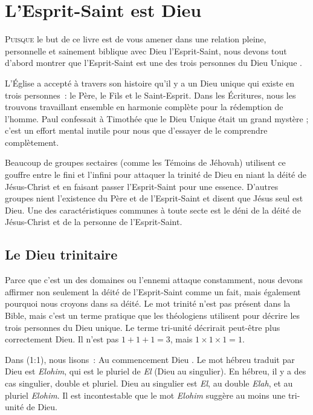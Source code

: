\chapter{L'Esprit-Saint est Dieu}

\lettrine[lines=3]{P}{uisque} le but de ce livre est de vous amener dans une relation pleine, personnelle et sainement biblique avec Dieu l'Esprit-Saint, nous devons tout d'abord montrer que l'Esprit-Saint est une des trois personnes du Dieu Unique .

L'Église a accepté à travers son histoire qu'il y a un Dieu unique qui existe en trois personnes~: le Père, le Fils et le Saint-Esprit. Dans les Écritures, nous les trouvons travaillant ensemble en harmonie complète pour la rédemption de l'homme. Paul confessait à Timothée que le Dieu Unique était un grand mystère ; c'est un effort mental inutile pour nous que d'essayer de le comprendre complètement.

Beaucoup de groupes sectaires (comme les Témoins de Jéhovah) utilisent ce gouffre entre le fini et l'infini pour attaquer la trinité de Dieu en niant la déité de Jésus-Christ et en faisant passer l'Esprit-Saint pour une essence. D'autres groupes nient l'existence du Père et de l'Esprit-Saint et disent que Jésus seul est Dieu. Une des caractéristiques communes à toute secte est le déni de la déité de Jésus-Christ et de la personne de l'Esprit-Saint.

\section*{Le Dieu trinitaire}

Parce que c'est un des domaines ou l'ennemi attaque constamment, nous devons affirmer non seulement la déité de l'Esprit-Saint comme un fait, mais également pourquoi nous croyons dans sa déité. Le mot \og trinité \fg{} n'est pas présent dans la Bible, mais c'est un terme pratique que les théologiens utilisent pour décrire les trois personnes du Dieu unique. Le terme \og tri-unité \fg{} décrirait peut-être plus correctement Dieu. Il n'est pas $1 + 1 + 1 = 3$, mais $1 \times 1 \times 1 = 1$.

Dans (1:1), nous lisons~: \og Au commencement Dieu \fg{}. Le mot hébreu traduit par \og Dieu \fg{} est \emph{Elohim}, qui est le pluriel de \emph{El} (Dieu au singulier). En hébreu, il y a des cas singulier, double et pluriel. \og Dieu \fg{} au singulier est \emph{El}, au double \emph{Elah}, et au pluriel \emph{Elohim}. Il est incontestable que le mot \emph{Elohim} suggère au moins une tri-unité de Dieu.


